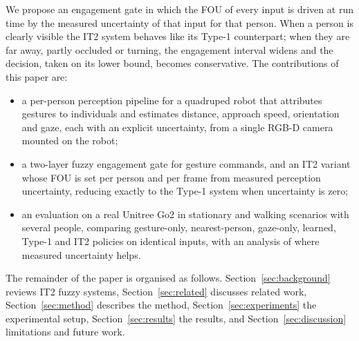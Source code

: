 We propose an engagement gate in which the FOU of every input is driven at
run time by the measured uncertainty of that input for that person. When a
person is clearly visible the IT2 system behaves like its Type-1 counterpart;
when they are far away, partly occluded or turning, the engagement interval
widens and the decision, taken on its lower bound, becomes conservative. The
contributions of this paper are:
\begin{itemize}
\item a per-person perception pipeline for a quadruped robot that attributes
  gestures to individuals and estimates distance, approach speed,
  orientation and gaze, each with an explicit uncertainty, from a single
  RGB-D camera mounted on the robot;
\item a two-layer fuzzy engagement gate for gesture commands, and an IT2
  variant whose FOU is set per person and per frame from measured perception
  uncertainty, reducing exactly to the Type-1 system when uncertainty is
  zero;
\item an evaluation on a real Unitree Go2 in stationary and walking
  scenarios with several people, comparing gesture-only, nearest-person,
  gaze-only, learned, Type-1 and IT2 policies on identical inputs, with an
  analysis of where measured uncertainty helps.
\end{itemize}

The remainder of the paper is organised as follows. Section~\ref{sec:background}
reviews IT2 fuzzy systems, Section~\ref{sec:related} discusses related work,
Section~\ref{sec:method} describes the method, Section~\ref{sec:experiments}
the experimental setup, Section~\ref{sec:results} the results, and
Section~\ref{sec:discussion} limitations and future work.
